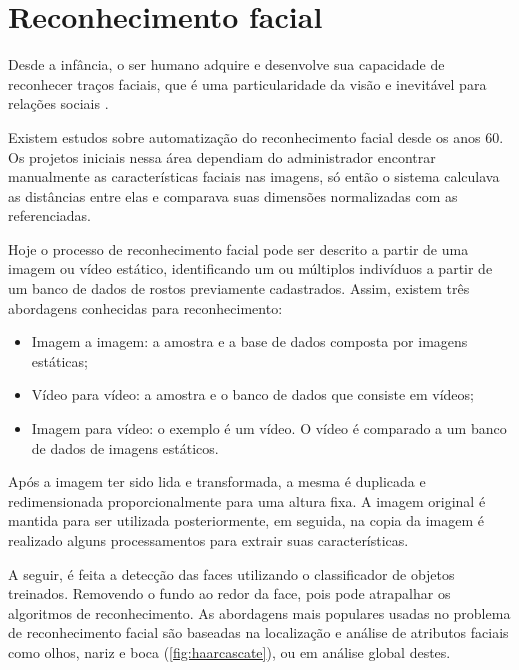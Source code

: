\section{Reconhecimento facial}\label{sec:reconhecimento}

Desde a infância, o ser humano adquire e desenvolve sua capacidade de reconhecer traços faciais, 
que é uma particularidade da visão e inevitável para relações sociais \cite{rouhani2019}.

Existem estudos sobre automatização do reconhecimento facial desde os anos 60. Os projetos iniciais nessa 
área dependiam do administrador encontrar manualmente as características faciais nas imagens, só 
então o sistema calculava as distâncias entre elas e comparava suas dimensões normalizadas com 
as referenciadas.

Hoje o processo de reconhecimento facial pode ser descrito a partir de uma imagem ou vídeo estático, 
identificando um ou múltiplos indivíduos a partir de um banco de dados de rostos previamente 
cadastrados. Assim, existem três abordagens conhecidas para reconhecimento:

\begin{itemize}
    \item Imagem a imagem: a amostra e a base de dados composta por imagens estáticas;

    \item Vídeo para vídeo: a amostra e o banco de dados que consiste em vídeos;

    \item Imagem para vídeo: o exemplo é um vídeo. O vídeo é comparado a um banco de 
    dados de imagens estáticos. 
\end{itemize}

Após a imagem ter sido lida e transformada, a mesma é duplicada e redimensionada 
proporcionalmente para uma altura fixa. A imagem original é mantida para ser 
utilizada posteriormente, em seguida, na copia da imagem é realizado alguns 
processamentos para extrair suas características.

A seguir, é feita a detecção das faces utilizando o classificador 
de objetos treinados. Removendo o fundo ao redor da face, pois 
pode atrapalhar os algoritmos de reconhecimento. As abordagens mais 
populares usadas no problema de reconhecimento facial são 
baseadas na localização e análise de atributos faciais como olhos, nariz e 
boca (\autoref{fig:haarcascate}), ou em análise global destes.

